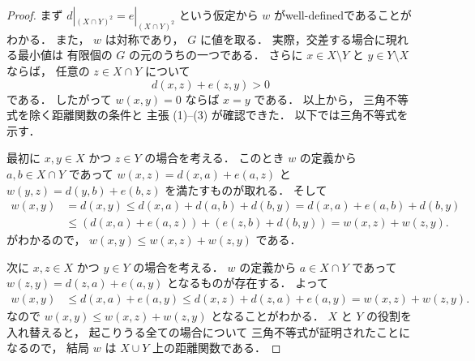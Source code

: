 \documentclass[leqno, 12pt]{jsarticle}
\newcommand{\restr}[2]{#1|_{#2}}
\begin{document}
\begin{proof}
まず
$\restr{d}{(X\cap Y)^2}=\restr{e}{(X\cap Y)^2}$
という仮定から
$w$
がwell-definedであることがわかる．
また，
$w$
は対称であり，
$G$
に値を取る．
実際，交差する場合に現れる最小値は
有限個の
$G$
の元のうちの一つである．
さらに
$x\in X\setminus Y$
と
$y\in Y\setminus X$
ならば，
任意の
$z\in X\cap Y$
について
\[
d(x,z)+e(z,y)>0
\]
である．
したがって
$w(x,y)=0$
ならば
$x=y$
である．
以上から，
三角不等式を除く距離関数の条件と
主張
\textup{(1)}--\textup{(3)}
が確認できた．
以下では三角不等式を示す．


最初に
$x, y\in X$
かつ
$z\in Y$
の場合を考える．
このとき
$w$
の定義から
$a, b\in X\cap Y$
であって
$w(x, z)=d(x, a)+e(a, z)$
と
$w(y, z)=d(y, b)+e(b, z)$
を満たすものが取れる．
そして
\begin{align*}
	w(x, y)&=
	d(x, y)\le d(x, a)+d(a, b)+d(b, y)
	=d(x, a)+e(a, b)+d(b, y)\\
	&\le (d(x, a)+e(a, z))+(e(z, b)+d(b, y))
	=w(x, z)+w(z, y).
\end{align*}
がわかるので，
$w(x, y)\le w(x, z)+w(z, y)$
である．



次に
$x, z\in  X$
かつ
$y\in Y$
の場合を考える．
$w$
の定義から
$a\in X\cap Y$
であって
$w(z, y)=d(z, a)+e(a, y)$
となるものが存在する．
よって
\begin{align*}
	w(x, y)
	&\le
	 d(x, a)+e(a, y)
	\le
	d(x, z)+d(z, a)+e(a, y)
	=w(x, z)+w(z, y).
\end{align*}
なので
$w(x, y)\le w(x, z)+w(z, y)$
となることがわかる．
$X$
と
$Y$
の役割を入れ替えると，
起こりうる全ての場合について
三角不等式が証明されたことになるので，
結局
$w$
は
$X\cup Y$
上の距離関数である．
\end{proof}
\end{document}
